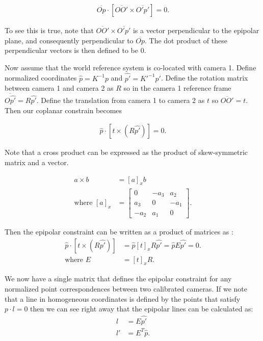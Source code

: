 \documentclass[twoside]{article}
\begin{document}
\begin{align}
\overline{Op} \cdot [\overline{OO'} \times \overline{O'p'}] = 0.
\end{align}

To see this is true, note that $\overline{OO'} \times \overline{O'p'}$ is a vector perpendicular to the epipolar plane, and consequently perpendicular to $\overline{Op}$. The dot product of these perpendicular vectors is then defined to be 0.

Now assume that the world reference system is co-located with camera 1. Define normalized coordinates $\hat{p} = K^{-1}p$ and $\hat{p'} = K'^{-1}p'$. Define the rotation matrix between camera 1 and camera 2 as $R$ so in the camera 1 reference frame $\overline{O\hat{p'}} = R\hat{p'}$. Define the translation from camera 1 to camera 2 as $t$ so $\overline{OO'} = t$. Then our coplanar constrain becomes

\begin{align}
\hat{p} \cdot [t \times (R\hat{p'})] = 0.
\end{align}

Note that a cross product can be expressed as the product of skew-symmetric matrix and a vector.

\begin{align}
a \times b &= [a]_x b \\
\text{where } [a]_x &= \begin{bmatrix}
0 & -a_3 & a_2 \\
a_3 & 0 & -a_1 \\
-a_2 & a_1 & 0
\end{bmatrix} .
\end{align}

Then the epipolar constraint can be written as a product of matrices as :
\begin{align}
\hat{p} \cdot [t \times (R\hat{p'})] &= \hat{p} [t]_x R \hat{p'} = \hat{p}E\hat{p'} = 0. \\
\text{where } E &= [t]_xR.
\end{align}

We now have a single matrix that defines the epipolar constraint for any normalized point correspondences between two calibrated cameras. If we note that a line in homogeneous coordinates is defined by the points that satisfy $p \cdot l = 0$ then we can see right away that the epipolar lines can be calculated as:
\begin{align}
l &= E\hat{p'} \\
l' &= E^T\hat{p}.
\end{align}
\end{document}
